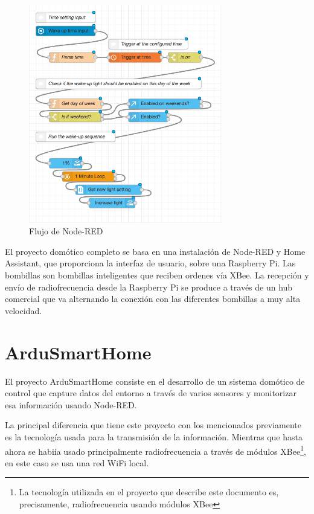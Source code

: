 \begin{figure}[tb]
\centering
\includegraphics[width=0.75\textwidth]{figuras/EArte7.png}
\caption{Flujo de Node-RED}
\label{fig:EArte7}
\end{figure}

El proyecto domótico completo se basa en una instalación de Node-RED y Home Assistant, que proporciona la interfaz de usuario, sobre una Raspberry Pi. Las bombillas son bombillas inteligentes que reciben ordenes vía XBee. La recepción y envío de radiofrecuencia desde la Raspberry Pi se produce a través de un hub comercial que va alternando la conexión con las diferentes bombillas a muy alta velocidad.

\section{ArduSmartHome \cite{UOC:2017}}

El proyecto ArduSmartHome consiste en el desarrollo de un sistema domótico de control que capture datos del entorno a través de varios sensores y monitorizar esa información usando Node-RED.

La principal diferencia que tiene este proyecto con los mencionados previamente es la tecnología usada para la transmisión de la información. Mientras que hasta ahora se habiía usado principalmente radiofrecuencia a través de módulos XBee\footnote{La tecnología utilizada en el proyecto que describe este documento es, precisamente, radiofrecuencia usando módulos XBee}, en este caso se usa una red WiFi local.

